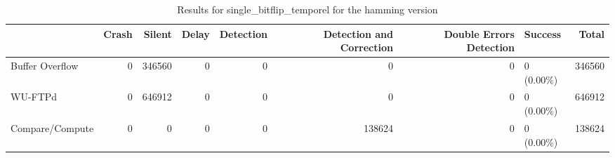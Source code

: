 \begin{table}[t]
	\centering
	\caption{Results for single_bitflip_temporel for the hamming version}
	\label{table:end_sim_by_status_hamming_1_single_bitflip_temporel}
	\begin{tabular}{lrrrrrrlr}
		\toprule
		                & Crash & Silent & Delay & Detection & Detection and Correction & Double Errors Detection & Success    & Total  \\
		\midrule
		Buffer Overflow & 0     & 346560 & 0     & 0         & 0                        & 0                       & 0 (0.00\%) & 346560 \\
		WU-FTPd         & 0     & 646912 & 0     & 0         & 0                        & 0                       & 0 (0.00\%) & 646912 \\
		Compare/Compute & 0     & 0      & 0     & 0         & 138624                   & 0                       & 0 (0.00\%) & 138624 \\
		\bottomrule
	\end{tabular}
\end{table}
